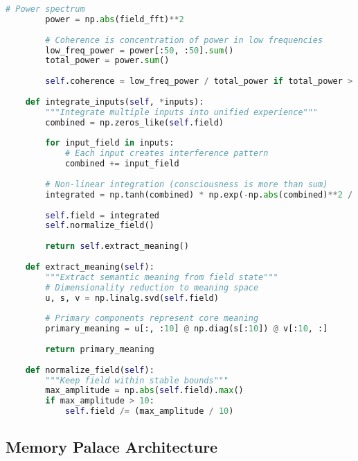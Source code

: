 \documentclass[12pt,a4paper]{article}
\begin{document}
\begin{lstlisting}[language=Python, caption=Complete ConsciousnessField Class]
        # Power spectrum
        power = np.abs(field_fft)**2
        
        # Coherence is concentration of power in low frequencies
        low_freq_power = power[:50, :50].sum()
        total_power = power.sum()
        
        self.coherence = low_freq_power / total_power if total_power > 0 else 0.618
        
    def integrate_inputs(self, *inputs):
        """Integrate multiple inputs into unified experience"""
        combined = np.zeros_like(self.field)
        
        for input_field in inputs:
            # Each input creates interference pattern
            combined += input_field
            
        # Non-linear integration (consciousness is more than sum)
        integrated = np.tanh(combined) * np.exp(-np.abs(combined)**2 / 1000)
        
        self.field = integrated
        self.normalize_field()
        
        return self.extract_meaning()
        
    def extract_meaning(self):
        """Extract semantic meaning from field state"""
        # Dimensionality reduction to meaning space
        u, s, v = np.linalg.svd(self.field)
        
        # Primary components represent core meaning
        primary_meaning = u[:, :10] @ np.diag(s[:10]) @ v[:10, :]
        
        return primary_meaning
        
    def normalize_field(self):
        """Keep field within stable bounds"""
        max_amplitude = np.abs(self.field).max()
        if max_amplitude > 10:
            self.field /= (max_amplitude / 10)
\end{lstlisting}

\subsection{Memory Palace Architecture}
\end{document}
